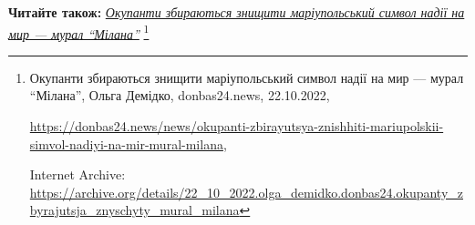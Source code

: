  
 
 
 
 


\textbf{Читайте також:} \href{https://archive.org/details/22_10_2022.olga_demidko.donbas24.okupanty_zbyrajutsja_znyschyty_mural_milana}{\emph{Окупанти збираються знищити маріупольський символ надії на мир — мурал \enquote{Мілана}}}%
\footnote{Окупанти збираються знищити маріупольський символ надії на мир — мурал \enquote{Мілана}, Ольга Демідко, donbas24.news, 22.10.2022, \par%
\url{https://donbas24.news/news/okupanti-zbirayutsya-znishhiti-mariupolskii-simvol-nadiyi-na-mir-mural-milana}, \par%
Internet Archive: \url{https://archive.org/details/22_10_2022.olga_demidko.donbas24.okupanty_zbyrajutsja_znyschyty_mural_milana}%
}
